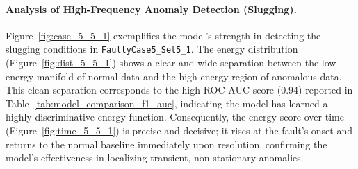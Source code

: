 \documentclass{article}
\begin{document}
\paragraph{Analysis of High-Frequency Anomaly Detection (Slugging).}
Figure~\ref{fig:case_5_5_1} exemplifies the model's strength in detecting the slugging conditions in \texttt{FaultyCase5\_Set5\_1}. The energy distribution (Figure~\ref{fig:dist_5_5_1}) shows a clear and wide separation between the low-energy manifold of normal data and the high-energy region of anomalous data. This clean separation corresponds to the high ROC-AUC score (0.94) reported in Table~\ref{tab:model_comparison_f1_auc}, indicating the model has learned a highly discriminative energy function. Consequently, the energy score over time (Figure~\ref{fig:time_5_5_1}) is precise and decisive; it rises at the fault's onset and returns to the normal baseline immediately upon resolution, confirming the model's effectiveness in localizing transient, non-stationary anomalies.
\end{document}
